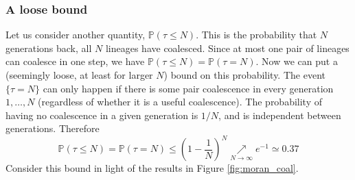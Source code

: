 \documentclass{article}
\newcommand{\PR}{\mathbb{P}}
\begin{document}
\subsubsection*{A loose bound}
Let us consider another quantity, $\PR(\tau \leq N)$. This is the probability that $N$ generations back, all $N$ lineages have coalesced. Since at most one pair of lineages can coalesce in one step, we have $\PR(\tau \leq N) = \PR(\tau = N)$.
Now we can put a (seemingly loose, at least for larger $N$) bound on this probability. The event $\{\tau=N\}$ can only happen if there is some pair coalescence in every generation $1,\dots,N$ (regardless of whether it is a useful coalescence). The probability of having no coalescence in a given generation is $1/N$, and is independent between generations. Therefore
\begin{equation*}
\PR(\tau \leq N) = \PR(\tau = N) \leq \left(1-\frac{1}{N}\right)^N \underset{N\rightarrow\infty}{\nearrow} e^{-1} \simeq 0.37
\end{equation*}
Consider this bound in light of the results in Figure \ref{fig:moran_coal}.
\end{document}
